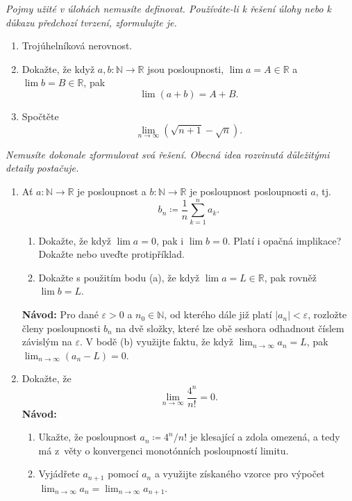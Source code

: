 \documentclass[a4paper,11pt]{article}
\newcommand{\R}{\mathbb{R}}
\newcommand{\N}{\mathbb{N}}
\begin{document}
 \begin{tcolorbox}[title=\textsf{Lehké úlohy a důkazy (6
  bodů)},arc=0mm,boxsep=3mm,bottomrule=1pt,toprule=3pt,leftrule=-0.1mm,
  rightrule=-0.1mm,colframe=Emerald!80!white,colback=Emerald!5!white]
  \emph{Pojmy užité v úlohách nemusíte definovat. Používáte-li k řešení úlohy
  nebo k důkazu předchozí tvrzení, zformulujte je.}
  \begin{enumerate}
   \item Trojúhelníková nerovnost.
   \item Dokažte, že když $a,b:\N \to \R$ jsou posloupnosti, $\lim a = A \in \R$
    a $\lim b = B \in \R$, pak
    \[
     \lim (a + b) = A + B.
    \]
   \item Spočtěte
    \[
     \lim_{n \to \infty} (\sqrt{n+1}-\sqrt{n}).
    \]
  \end{enumerate}
 \end{tcolorbox}
 \clearpage
 \begin{tcolorbox}[breakable,title=\textsf{Těžké úlohy a důkazy (12
  bodů)},arc=0mm,boxsep=3mm,bottomrule=1pt,toprule=1pt,leftrule=-0.1mm,
  rightrule=-0.1mm,colframe=BrickRed!80!white,colback=BrickRed!5!white]
  \emph{Nemusíte dokonale zformulovat svá řešení. Obecná idea rozvinutá
  důležitými detaily postačuje.}
  \begin{enumerate}
   \item Ať $a:\N \to \R$ je posloupnost a $b:\N \to \R$ je posloupnost
     posloupnosti $a$, tj.
    \[
     b_n \coloneqq \frac{1}{n}\sum_{k=1}^n a_k.
    \]
    \begin{enumerate}
     \item Dokažte, že když $\lim a = 0$, pak i $\lim b = 0$. Platí i opačná
      implikace? Dokažte nebo uveďte protipříklad.
     \item Dokažte s použitím bodu (a), že když $\lim a = L \in \R$, pak rovněž
      $\lim b = L$.
    \end{enumerate}
    \textbf{Návod:} Pro dané $\varepsilon>0$ a $n_0 \in \N$, od kterého dále již
    platí $|a_n|<\varepsilon$, rozložte členy posloupnosti $b_n$ na dvě složky,
    které lze obě seshora odhadnout číslem závislým na $\varepsilon$. V bodě (b)
    využijte faktu, že když $\lim_{n \to \infty} a_n = L$, pak $\lim_{n \to
    \infty} (a_n - L) = 0$.
   \item Dokažte, že
    \[
     \lim_{n \to \infty} \frac{4^{n}}{n!} = 0.
    \]
    \textbf{Návod:}
    \begin{enumerate}
     \item Ukažte, že posloupnost $a_n \coloneqq 4^{n} / n!$ je klesající a
      zdola omezená, a tedy má z~věty o konvergenci monotónních posloupností
      limitu.
     \item Vyjádřete $a_{n+1}$ pomocí $a_n$ a využijte získaného vzorce pro
      výpočet $\lim_{n \to \infty} a_{n} = \lim_{n \to \infty} a_{n+1}$.
    \end{enumerate}
  \end{enumerate}
 \end{tcolorbox}
\end{document}
